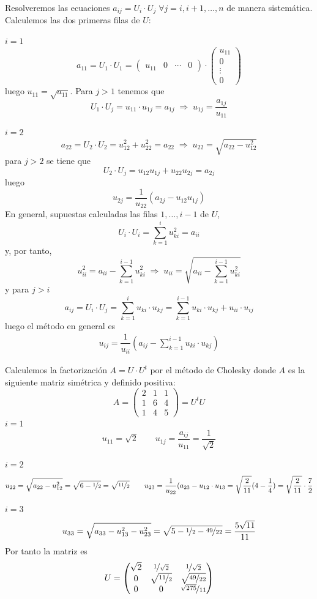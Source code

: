 \begin{met} Resolveremos las ecuaciones $a_{ij}=U_i \cdot U_j \; \forall j=i, i+1, \ldots, n$ de manera sistemática. Calculemos las dos primeras filas de $U$:

\underline{$i=1$}
$$a_{11}=U_1\cdot U_1=\begin{pmatrix}
    u_{11}&0&\cdots &0
\end{pmatrix}\cdot \begin{pmatrix}
    u_{11}\\
    0\\
    \vdots\\
    0
\end{pmatrix}$$
luego $u_{11}=\sqrt{a_{11}}$. Para $j>1$ tenemos que
$$U_{1} \cdot U_j=u_{11} \cdot u_{1j}=a_{1j} \; \Rightarrow \; u_{1j}=\dfrac{a_{1j}}{u_{11}}$$

\underline{$i=2$}
$$a_{22}=U_2 \cdot U_2=u_{12}^2+u^2_{22}=a_{22} \; \Rightarrow \; u_{22}=\sqrt{a_{22}-u_{12}^2}$$
para $j>2$ se tiene que
$$U_2 \cdot U_j=u_{12} u_{1j} + u_{22} u_{2j}=a_{2j}$$
luego $$u_{2j}=\dfrac{1}{u_{22}}(a_{2j}-u_{12}u_{1j})$$
En general, supuestas calculadas las filas $1,\ldots, i-1$ de $U$,
$$U_i \cdot U_i = \sum_{k=1}^i u_{ki}^2=a_{ii}$$
y, por tanto, 
$$u_{ii}^2=a_{ii}- \sum_{k=1}^{i-1} u_{ki}^2 \; \Rightarrow \; u_{ii}=\sqrt{a_{ii}- \sum_{k=1}^{i-1} u_{ki}^2}$$
y para $j > i$
$$a_{ij}=U_i \cdot U_j=\sum_{k=1}^iu_{ki}\cdot u_{kj}=\sum_{k=1}^{i-1}u_{ki}\cdot u_{kj}+u_{ii}\cdot u_{ij}$$
luego el método en general es
\begin{align}
u_{ij}=\dfrac{1}{u_{ii}}\left(a_{ij}-\sum_{k=1}^{i-1}u_{ki}\cdot u_{kj}\right) 
\label{met:chol}
\end{align}
\end{met}
\begin{ejem}
Calculemos la factorización $A=U\cdot U^t$ por el método de Cholesky donde $A$ es la siguiente matriz simétrica y definido positiva:
$$A=\begin{pmatrix}
    2&1&1\\
    1&6&4\\
    1&4&5
\end{pmatrix}=U^t U$$
\underline{$i=1$}
$$u_{11}=\sqrt{2} \qquad u_{1j}=\dfrac{a_{ij}}{u_{11}}=\dfrac{1}{\sqrt{2}}$$

\noindent\underline{$i=2$}
$$u_{22}=\sqrt{a_{22}-u_{12}^2}=\sqrt{6-\nicefrac{1}{2}}=\sqrt{\nicefrac{11}{2}} \qquad u_{23}=\dfrac{1}{u_{22}}(a_{23}-u_{12}\cdot u_{13}=\sqrt{\dfrac{2}{11}}(4-\dfrac{1}{4})=\sqrt{\dfrac{2}{11}}\cdot \dfrac{7}{2}$$

\noindent\underline{$i=3$}
$$u_{33}=\sqrt{a_{33}-u_{13}^2-u_{23}^2} = \sqrt{5 - \nicefrac{1}{2}-\nicefrac{49}{22}}=\dfrac{5\sqrt{11}}{11}$$
Por tanto la matriz es 
$$U=\begin{pmatrix}
\sqrt{2}&\nicefrac{1}{\sqrt{2}}&\nicefrac{1}{\sqrt{2}} \\
0& \sqrt{\nicefrac{11}{2}} & \sqrt{\nicefrac{49}{22}}\\
0&0&\nicefrac{\sqrt{275}}{11}
\end{pmatrix}$$
\end{ejem}
